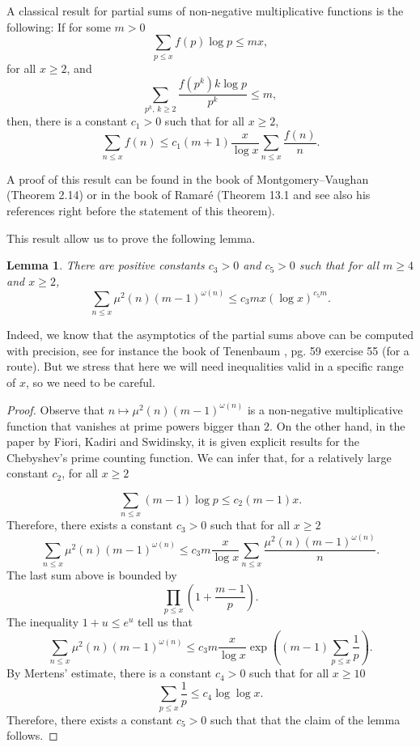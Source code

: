 \documentclass[reqno0,12pt]{amsart}
\newtheorem{lemma}{Lemma}[section]
\theoremstyle{remark}
\begin{document}
A classical result for partial sums of non-negative multiplicative functions is the following: If for some $m>0$
$$\sum_{p\leq x}f(p)\log p\leq mx,$$
for all $x\geq 2$, and
$$\sum_{p^k,\,k\geq 2}\frac{f(p^k)k\log p}{p^k}\leq m,$$
then, there is a constant $c_1>0$ such that for all $x\geq 2$,
$$\sum_{n\leq x}f(n)\leq c_1(m+1)\frac{x}{\log x}\sum_{n\leq x}\frac{f(n)}{n}.$$

A proof of this result can be found in the book of Montgomery--Vaughan \cite{montgomery_livro} (Theorem 2.14)  or in the book of Ramaré \cite{ramare_book} (Theorem 13.1 and see also his references right before the statement of this theorem).

This result allow us to prove the following lemma. 
\begin{lemma}\label{lemma explicite estimate partial sum} There are positive constants $c_3>0$ and $c_5>0$ such that for all $m\geq 4$ and $x\geq 2$,
\begin{equation}\label{equation upper bound 3 omega n}
\sum_{n\leq x}\mu^2(n)(m-1)^{\omega(n)}\leq c_3mx(\log x)^{c_5m}.
\end{equation}
\end{lemma}

Indeed, we know that the asymptotics of the partial sums above can be computed with precision, see for instance the book of Tenenbaum \cite{tenenbaumlivro}, pg. 59 exercise 55 (for a route). But we stress that here we will need inequalities valid in a specific range of $x$, so we need to be careful.
\begin{proof}
Observe that $n\mapsto \mu^2(n)(m-1)^{\omega(n)}$ is a non-negative multiplicative function that vanishes at prime powers bigger than $2$. On the other hand, in the paper \cite{kadiri_explicit} by Fiori, Kadiri and Swidinsky, it is given explicit results for the Chebyshev's prime counting function. We can infer that, for a relatively large constant $c_2$, for all $x\geq 2$

$$\sum_{n\leq x}(m-1)\log p \leq c_2(m-1)x. $$
Therefore, there exists a constant $c_3>0$ such that for all $x\geq 2$
$$\sum_{n\leq x}\mu^2(n)(m-1)^{\omega(n)}\leq c_3m\frac{x}{\log x}\sum_{n\leq x}\frac{\mu^2(n)(m-1)^{\omega(n)}}{n}.$$
The last sum above is bounded by
$$\prod_{p\leq x}\left(1+\frac{m-1}{p}\right).$$
The inequality $1+u\leq e^{u}$ tell us that 
$$\sum_{n\leq x}\mu^2(n)(m-1)^{\omega(n)}\leq c_3m\frac{x}{\log x}\exp\left((m-1)\sum_{p\leq x}\frac{1}{p}\right).$$
By Mertens' estimate, there is a constant $c_4>0$ such that for all $x\geq 10$
$$\sum_{p\leq x}\frac{1}{p}\leq c_4\log\log x.$$
Therefore, there exists a constant $c_5>0$ such that that the claim of the lemma follows. \end{proof}
\end{document}
